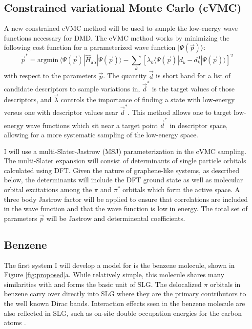 \documentclass[12pt]{article}
\begin{document}
\subsection{Constrained variational Monte Carlo (cVMC)}
A new constrained cVMC method will be used to sample the low-energy wave functions necessary for DMD.
The cVMC method works by minimizing the following cost function for a parameterized wave function $|\Psi(\vec{p})\rangle$:
\begin{equation}
\vec{p}^* = \text{argmin} \ \langle \Psi(\vec{p}) | \hat{H}_\text{ab} | \Psi(\vec{p}) \rangle - \sum_k [\lambda_k \langle \Psi(\vec{p}) | d_k - d_{k}^0 | \Psi(\vec{p}) \rangle]^2
\end{equation}
with respect to the parameters $\vec{p}$.
The quantity $\vec{d}$ is short hand for a list of candidate descriptors to sample variations in, $\vec{d}^*$ is the target values of those descriptors, and $\vec{\lambda}$ controls the importance of finding a state with low-energy versus one with descriptor values near $\vec{d}^*$.
This method allows one to target low-energy wave functions which sit near a target point $\vec{d}^*$ in descriptor space, allowing for a more systematic sampling of the low-energy space.

I will use a multi-Slater-Jastrow (MSJ) parameterization in the cVMC sampling.
The multi-Slater expansion will consist of determinants of single particle orbitals calculated using DFT.
Given the nature of graphene-like systems, as described below, the determinants will include the DFT ground state as well as molecular orbital excitations among the $\pi$ and $\pi^*$ orbitals which form the active space.
A three body Jastrow factor will be applied to ensure that correlations are included in the wave function and that the wave function is low in energy.
The total set of parameters $\vec{p}$ will be Jastrow and determinental coefficients.

\subsection{Benzene}
The first system I will develop a model for is the benzene molecule, shown in Figure \ref{fig:proposed}a.
While relatively simple, this molecule shares many similarities with and forms the basic unit of SLG.
The delocalized $\pi$ orbitals in benzene carry over directly into SLG where they are the primary contributors to the well known Dirac bands.
Interaction effects seen in the benzene molecule are also reflected in SLG, such as on-site double occupation energies for the carbon atoms \cite{Zheng2017, Wagner2015}.
\end{document}
